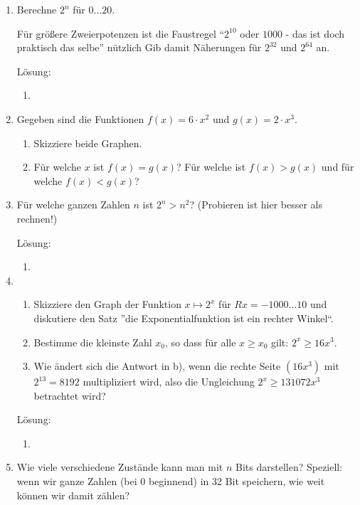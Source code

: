 \documentclass[../main.tex]{subfiles}
\begin{document}
\begin{enumerate}
	\item Berechne \( 2^n \) für \( 0 \dots 20 \).

	      Für größere Zweierpotenzen ist die Faustregel "`\( 2^{10} \) oder \( 1000 \) - das ist doch praktisch das selbe"'
	      nützlich Gib damit Näherungen für \( 2^{32} \) und \( 2^{64} \) an.

	      Lösung:
	      \begin{enumerate}
		      \item
	      \end{enumerate}
	\item Gegeben sind die Funktionen \( f(x) = 6 \cdot x^2 \) und \( g(x) = 2 \cdot x^3 \).
	      \begin{enumerate}
		      \item Skizziere beide Graphen.
		      \item Für welche \( x \) ist \( f(x) = g(x) \)?
		            Für welche ist \( f(x) > g(x) \) und für welche \( f(x) < g(x) \)?
	      \end{enumerate}
	\item Für welche ganzen Zahlen \( n \) ist \( 2^n > n^2 \)?
	      (Probieren ist hier besser als rechnen!)

	      Lösung:
	      \begin{enumerate}
		      \item
	      \end{enumerate}
	\item \begin{enumerate}
		      \item Skizziere den Graph der Funktion \( x \mapsto 2^x \) für \(Rx = -1000 \dots 10 \)
		            und diskutiere den Satz ”die Exponentialfunktion ist ein rechter Winkel“.
		      \item Bestimme die kleinste Zahl \( x_0 \), so dass für alle \( x \geq x_0 \)
		            gilt: \( 2^x \geq 16x^3 \).
		      \item Wie ändert sich die Antwort in b),
		            wenn die rechte Seite \( (16x^3) \) mit \( 2^{13} = 8192 \)
		            multipliziert wird, also die Ungleichung \( 2^x \geq 131072 x^3 \) betrachtet wird?
	      \end{enumerate}

	      Lösung:
	      \begin{enumerate}
		      \item
	      \end{enumerate}
	\item Wie viele verschiedene Zustände kann man mit \(
	      n
	      \) Bits darstellen?
	      Speziell: wenn wir ganze Zahlen (bei 0 beginnend) in 32 Bit speichern,
	      wie weit können wir damit zählen?


\end{enumerate}
\end{document}
